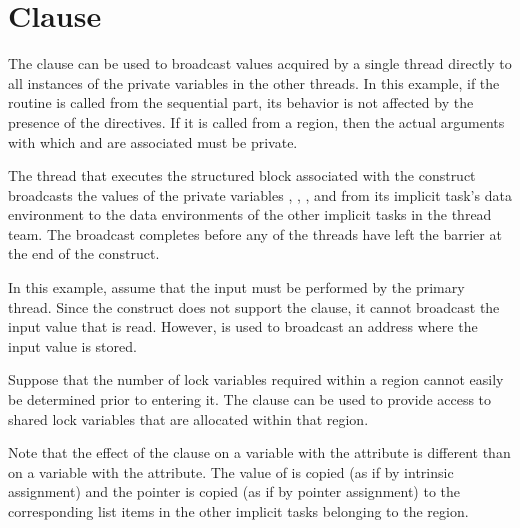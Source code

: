 \section{ Clause}
\label{sec:copyprivate}

The  clause can be used to broadcast values acquired by a single 
thread directly to all instances of the private variables in the other threads. 
In this example, if the routine is called from the sequential part, its behavior 
is not affected by the presence of the directives. If it is called from a  
region, then the actual arguments with which  and  are associated 
must be private. 

The thread that executes the structured block associated with the  
 construct broadcasts the values of the private variables , , 
, and 
 from its implicit task's data environment to the data environments 
of the other implicit tasks in the thread team. The broadcast completes before 
any of the threads have left the barrier at the end of the construct.



In this example, assume that the input must be performed by the primary thread. 
Since the  construct does not support the  clause, 
it cannot broadcast the input value that is read. However,  
is used to broadcast an address where the input value is stored. 



Suppose that the number of lock variables required within a  region 
cannot easily be determined prior to entering it. The  clause 
can be used to provide access to shared lock variables that are allocated within 
that  region.


\begin{fortranspecific}

Note that the effect of the  clause on a variable with the 
 attribute is different than on a variable with the  
attribute. The value of  is copied (as if by intrinsic assignment) and 
the pointer  is copied (as if by pointer assignment) to the corresponding 
list items in the other implicit tasks belonging to the  region. 
\pagebreak
{}
\end{fortranspecific}


